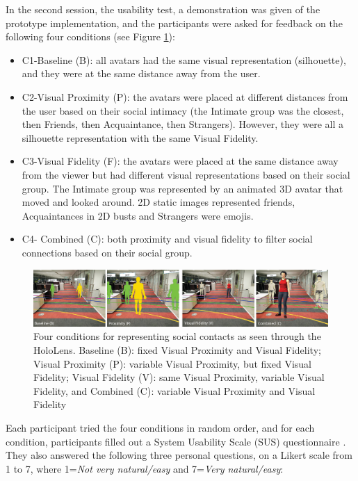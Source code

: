 In the second session, the usability test, a demonstration was given of the prototype implementation, and the participants were asked for feedback on the following four conditions (see Figure \ref{fig:contacts:conditions}): 


\begin{itemize}
    \item{C1-Baseline (B): all avatars had the same visual representation (silhouette), and they were at the same distance away from the user.}
    
    \item{C2-Visual Proximity (P): the avatars were placed at different distances from the user based on their social intimacy (the Intimate group was the closest, then Friends, then Acquaintance, then Strangers). However, they were all a silhouette representation with the same Visual Fidelity.}
    
    \item{C3-Visual Fidelity (F): the avatars were placed at the same distance away from the viewer but had different visual representations based on their social group. The Intimate group was represented by an animated 3D avatar that moved and looked around. 2D static images represented friends, Acquaintances in 2D busts and Strangers were emojis.
    }
    \item{C4- Combined (C): both proximity and visual fidelity to filter social connections based on their social group.}

\end{itemize}

\begin{figure}[ht]
    \centering
    \includegraphics[width=\linewidth]{images/41-visualising-mgia17/conditions-transparent-background}
    \caption{Four conditions for representing social contacts as seen through the HoloLens. Baseline (B): fixed Visual Proximity and Visual Fidelity; Visual Proximity (P): variable Visual Proximity, but fixed Visual Fidelity; Visual Fidelity (V): same Visual Proximity, variable Visual Fidelity, and Combined (C): variable Visual Proximity and Visual Fidelity}
    \label{fig:contacts:conditions}
\end{figure}

Each participant tried the four conditions in random order, and for each condition, participants filled out a System Usability Scale (SUS) questionnaire \cite{brooke1996sus}. They also answered the following three personal questions, on a Likert scale from 1 to 7, where 1=\textit{Not very natural/easy} and 7=\textit{Very natural/easy}:

